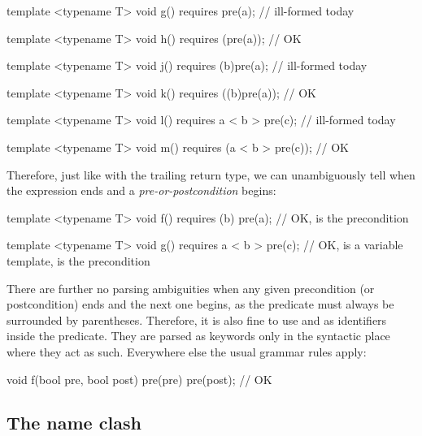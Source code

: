 \begin{codeblock}
template <typename T>
void g() requires pre(a);   // ill-formed today

template <typename T>
void h() requires (pre(a));   // OK

template <typename T>
void j() requires (b)pre(a);   // ill-formed today

template <typename T>
void k() requires ((b)pre(a));   // OK

template <typename T>
void l() requires a < b > pre(c);   // ill-formed today

template <typename T>
void m() requires (a < b > pre(c));   // OK

\end{codeblock}

Therefore, just like with the trailing return type, we can unambiguously tell when the expression ends and a \emph{pre-or-postcondition} begins:

\begin{codeblock}
template <typename T>
void f() requires (b) pre(a);   // OK,  is the precondition

template <typename T>
void g() requires a < b > pre(c);   // OK,  is a variable template,  is the precondition
\end{codeblock}

There are further no parsing ambiguities when any given precondition (or postcondition) ends and the next one begins, as the predicate must always be surrounded by parentheses. Therefore, it is also fine to use  and  as identifiers inside the predicate. They are parsed as keywords only in the syntactic place where they act as such. Everywhere else the usual grammar rules apply:

\begin{codeblock}
void f(bool pre, bool post)
  pre(pre) pre(post);   // OK
\end{codeblock}


\subsection{The  name clash}
\label{subsec:assrt}

